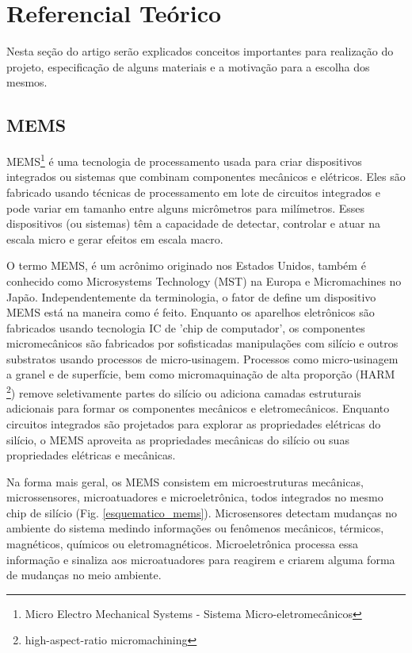 
\chapter[Referencial Teórico]{Referencial Teórico}
Nesta seção do artigo serão explicados conceitos importantes para realização do projeto, especificação de alguns materiais e a motivação para a escolha dos mesmos.  
	\section{MEMS}

		MEMS\footnote{Micro Electro Mechanical Systems - Sistema Micro-eletromecânicos}  é uma tecnologia de processamento usada para criar dispositivos integrados ou sistemas que combinam componentes mecânicos e elétricos. Eles são fabricado usando técnicas de processamento em lote de circuitos integrados e pode variar em tamanho entre alguns micrômetros para milímetros. Esses dispositivos (ou sistemas) têm a capacidade de detectar, controlar e atuar na escala micro e gerar efeitos em escala macro\cite{prime2002}. 

		O termo MEMS, é um acrônimo originado nos Estados Unidos, também é conhecido como Microsystems Technology (MST) na Europa e Micromachines no Japão. Independentemente da terminologia, o fator de define um dispositivo MEMS está na maneira como é feito. Enquanto os aparelhos eletrônicos são fabricados usando tecnologia IC de 'chip de computador', os componentes micromecânicos são fabricados por sofisticadas manipulações com silício e outros substratos usando processos de micro-usinagem. Processos como micro-usinagem a granel e de superfície, bem como micromaquinação de alta proporção (HARM \footnote{high-aspect-ratio micromachining}) remove seletivamente partes do silício ou adiciona camadas estruturais adicionais para formar os componentes mecânicos e eletromecânicos. Enquanto circuitos integrados são projetados para explorar as propriedades elétricas do silício, o MEMS aproveita as propriedades mecânicas do silício ou suas propriedades elétricas e mecânicas\cite{prime2002}.

		Na forma mais geral, os MEMS consistem em microestruturas mecânicas, microssensores, microatuadores e microeletrônica, todos integrados no mesmo chip de silício (Fig. \ref{esquematico_mems}). Microsensores detectam mudanças no ambiente do sistema medindo informações ou fenômenos mecânicos, térmicos, magnéticos, químicos ou eletromagnéticos. Microeletrônica processa essa informação e sinaliza aos microatuadores para reagirem e criarem alguma forma de mudanças no meio ambiente\cite{prime2002}.

